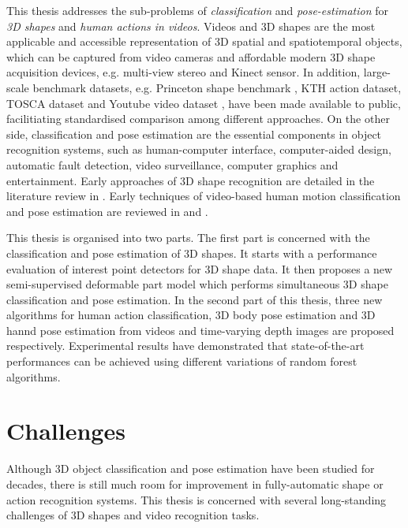 This thesis addresses the sub-problems of \emph{classification} and \emph{pose-estimation} for \emph{3D shapes} and \emph{human actions in videos}. 
Videos and 3D shapes are the most applicable and accessible representation of 3D spatial and spatiotemporal objects, which can be captured from video cameras and affordable modern 3D shape acquisition devices, e.g. multi-view stereo \cite{Vogiatzis2011} and Kinect sensor. 
In addition, large-scale benchmark datasets, e.g. Princeton shape benchmark \cite{Shilane2004},  KTH action dataset\cite{Schuldt2004}, TOSCA dataset \cite{Bronstein2011} and Youtube video dataset \cite{Liu2009}, have been made available to public, facilitiating standardised comparison among different approaches. 
On the other side, classification and pose estimation are the essential components in object recognition systems, such as human-computer interface, computer-aided design, automatic fault detection, video surveillance, computer graphics and entertainment. 
Early approaches of 3D shape recognition are detailed in the literature review in \cite{Besl1985}. Early techniques of video-based human motion classification and pose estimation are reviewed in \cite{Cedras1995} and \cite{Aggarwal1999}. 

This thesis is organised into two parts.  
The first part is concerned with the classification and pose estimation of 3D shapes. It starts with a performance evaluation of interest point detectors for 3D shape data. It then proposes a new semi-supervised deformable part model which performs simultaneous 3D shape classification and pose estimation. In the second part of this thesis, three new algorithms for human action classification, 3D body pose estimation and 3D hannd pose estimation from videos and time-varying depth images are proposed respectively. Experimental results have demonstrated that state-of-the-art performances can be achieved using different variations of random forest algorithms.    

\section{Challenges}

Although 3D object classification and pose estimation have been studied for decades, there is still much room for improvement in fully-automatic shape or action recognition systems. 
This thesis is concerned with several long-standing challenges of 3D shapes and video recognition tasks.  

